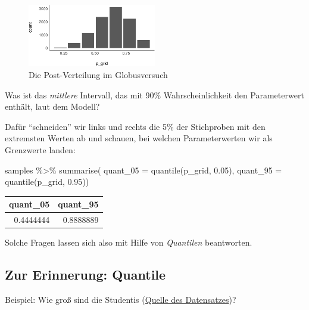\documentclass[
  a4paper,
  DIV=11]{scrreprt}
\newenvironment{Shaded}{\begin{snugshade}}{\end{snugshade}}
\newcommand{\AttributeTok}[1]{\textcolor[rgb]{0.40,0.45,0.13}{#1}}
\newcommand{\FloatTok}[1]{\textcolor[rgb]{0.68,0.00,0.00}{#1}}
\newcommand{\FunctionTok}[1]{\textcolor[rgb]{0.28,0.35,0.67}{#1}}
\newcommand{\NormalTok}[1]{\textcolor[rgb]{0.00,0.23,0.31}{#1}}
\newcommand{\SpecialCharTok}[1]{\textcolor[rgb]{0.37,0.37,0.37}{#1}}
\theoremstyle{definition}
\theoremstyle{remark}
\begin{document}
\begin{figure}[H]

{\centering \includegraphics[width=0.5\textwidth,height=\textheight]{./Post_files/figure-pdf/fig-post99-1.pdf}

}

\caption{\label{fig-post99}Die Post-Verteilung im Globusversuch}

\end{figure}

Was ist das \emph{mittlere} Intervall, das mit 90\% Wahrscheinlichkeit
den Parameterwert enthält, laut dem Modell?

Dafür ``schneiden'' wir links und rechts die 5\% der Stichproben mit den
extremsten Werten ab und schauen, bei welchen Parameterwerten wir als
Grenzwerte landen:

\begin{Shaded}
\begin{Highlighting}[]
\NormalTok{samples }\SpecialCharTok{\%\textgreater{}\%} 
  \FunctionTok{summarise}\NormalTok{(}
    \AttributeTok{quant\_05 =} \FunctionTok{quantile}\NormalTok{(p\_grid, }\FloatTok{0.05}\NormalTok{),}
    \AttributeTok{quant\_95 =} \FunctionTok{quantile}\NormalTok{(p\_grid, }\FloatTok{0.95}\NormalTok{))}
\end{Highlighting}
\end{Shaded}

\begin{longtable}[]{@{}rr@{}}
\toprule()
quant\_05 & quant\_95 \\
\midrule()
\endhead
0.4444444 & 0.8888889 \\
\bottomrule()
\end{longtable}

Solche Fragen lassen sich also mit Hilfe von \emph{Quantilen}
beantworten.

\hypertarget{zur-erinnerung-quantile}{%
\subsection{Zur Erinnerung: Quantile}\label{zur-erinnerung-quantile}}

Beispiel: Wie groß sind die Studentis
(\href{https://rdrr.io/cran/openintro/man/speed_gender_height.html}{Quelle
des Datensatzes})?
\end{document}
